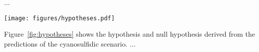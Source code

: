 \documentclass[twocolumn,twocolappendix,linenumbers]{aastex631}
\begin{document}
%


%

...
\begin{figure*}
    \begin{centering}
        \texttt{[image: figures/hypotheses.pdf]}
        \caption{Population-level hypothesis and null hypothesis on UV irradiance derived from the cyanosulfidic scenario.}
        \label{fig:hypotheses}
    \end{centering}
\end{figure*}
Figure~\ref{fig:hypotheses} shows the hypothesis and null hypothesis derived from the predictions of the cyanosulfidic scenario.
...
\end{document}

